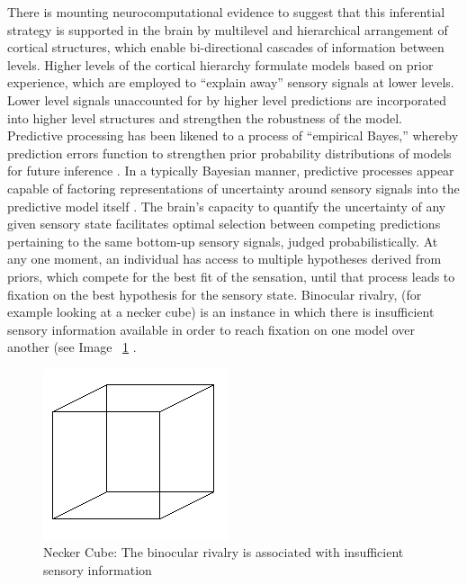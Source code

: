 \begin{mccorrection}
There is mounting neurocomputational evidence to suggest that this inferential strategy is supported in the brain by multilevel and hierarchical arrangement of cortical structures, which enable bi-directional cascades of information between levels.  Higher levels of the cortical hierarchy formulate models based on prior experience, which are employed to ``explain away'' sensory signals at lower levels. Lower level signals unaccounted for by higher level predictions are incorporated into higher level structures and strengthen the robustness of the model.  Predictive processing has been likened to a process of ``empirical Bayes,'' whereby prediction errors function to strengthen prior probability distributions of models for future inference \citep{Robbins1964}.  In a typically Bayesian manner, predictive processes appear capable of factoring representations of uncertainty around sensory signals into the predictive model itself \citep{Clark2013}.  The brain's capacity to quantify the uncertainty of any given sensory state facilitates optimal selection between competing predictions pertaining to the same bottom-up sensory signals, judged probabilistically.  At any one moment, an individual has access to multiple hypotheses derived from priors, which compete for the best fit of the sensation, until that process leads to fixation on the best hypothesis for the sensory state.
Binocular rivalry, (for example looking at a necker cube) is an instance in which there is insufficient sensory information available in order to reach fixation on one model over another (see Image ~\ref{fig:neckerCube} \citep{Frith2007}.

\begin{figure}[htbp]
  \begin{center}
    \includegraphics{images/Necker_cube.png}
      \caption{Necker Cube: The binocular rivalry is associated with insufficient sensory information}
        \label{fig:neckerCube}
   \end{center}
\end{figure}


\end{mccorrection}
